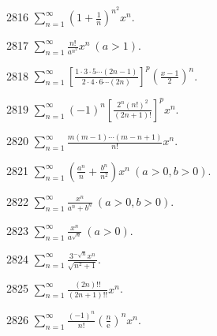 \begin{prob}[S]{2816}
$\displaystyle\sum_{n=1}^{\infty} \left(1 + \frac{1}{n}\right)^{n^2} x^n$.
\end{prob}

\begin{prob}[S]{2817}
$\displaystyle\sum_{n=1}^{\infty} \frac{n!}{a^{n^2}}x^n \ (a > 1)$.
\end{prob}

\begin{prob}[S]{2818}
$\displaystyle\sum_{n=1}^{\infty} \left[\frac{1 \cdot 3 \cdot 5 \cdots (2n-1)}{2 \cdot 4 \cdot 6 \cdots (2n)}\right]^p \left(\frac{x-1}{2}\right)^n$.
\end{prob}

\begin{prob}[S]{2819}
$\displaystyle\sum_{n=1}^{\infty} (-1)^n \left[\frac{2^n(n!)^2}{(2n+1)!}\right]^p x^n$.
\end{prob}

\begin{prob}[S]{2820}
$\displaystyle\sum_{n=1}^{\infty} \frac{m(m-1)\cdots(m-n+1)}{n!}x^n$.
\end{prob}

\begin{prob}[S]{2821}
$\displaystyle\sum_{n=1}^{\infty} \left(\frac{a^n}{n} + \frac{b^n}{n^2}\right)x^n \ (a > 0, b > 0)$.
\end{prob}

\begin{prob}[S]{2822}
$\displaystyle\sum_{n=1}^{\infty} \frac{x^n}{a^n + b^n} \ (a > 0, b > 0)$.
\end{prob}

\begin{prob}[S]{2823}
$\displaystyle\sum_{n=1}^{\infty} \frac{x^n}{a^{\sqrt{n}}} \ (a > 0)$.
\end{prob}

\begin{prob}[S]{2824}
$\displaystyle\sum_{n=1}^{\infty} \frac{3^{-\sqrt{n}}x^n}{\sqrt{n^2+1}}$.
\end{prob}

\begin{prob}[S]{2825}
$\displaystyle\sum_{n=1}^{\infty} \frac{(2n)!!}{(2n+1)!!}x^n$.
\end{prob}

\begin{prob}[S]{2826}
$\displaystyle\sum_{n=1}^{\infty} \frac{(-1)^n}{n!}\left(\frac{n}{\mathrm{e}}\right)^n x^n$.
\end{prob}

